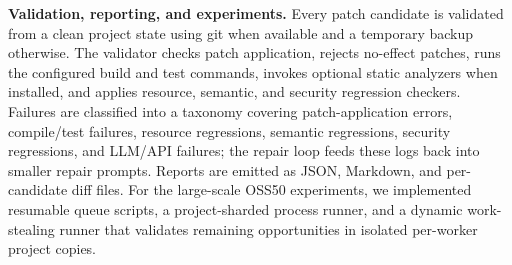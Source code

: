 \noindent\textbf{Validation, reporting, and experiments.}
Every patch candidate is validated from a clean project state using git when
available and a temporary backup otherwise. The validator checks patch
application, rejects no-effect patches, runs the configured build and test
commands, invokes optional static analyzers when installed, and applies
resource, semantic, and security regression checkers. Failures are classified
into a taxonomy covering patch-application errors, compile/test failures,
resource regressions, semantic regressions, security regressions, and LLM/API
failures; the repair loop feeds these logs back into smaller repair prompts.
Reports are emitted as JSON, Markdown, and per-candidate diff files. For the
large-scale OSS50 experiments, we implemented resumable queue scripts, a
project-sharded process runner, and a dynamic work-stealing runner that validates
remaining opportunities in isolated per-worker project copies.
